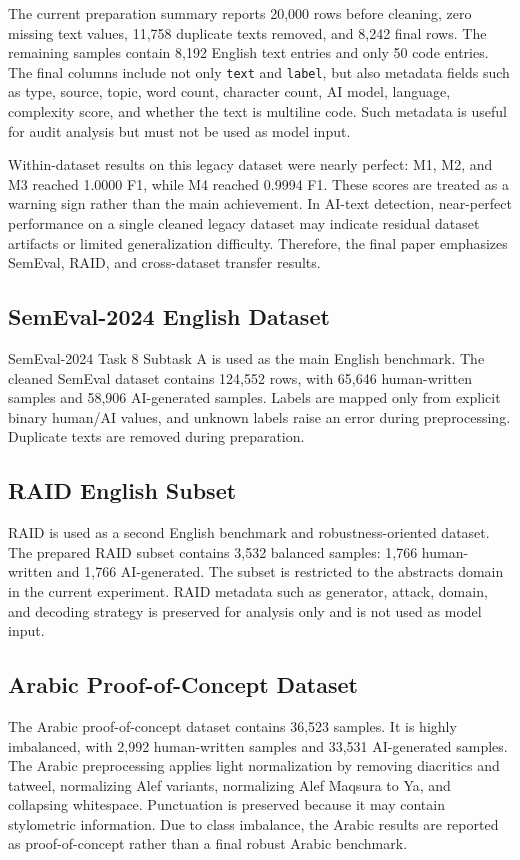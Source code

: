 \documentclass[conference]{IEEEtran}
\begin{document}
The current preparation summary reports 20,000 rows before cleaning, zero missing text values, 11,758 duplicate texts removed, and 8,242 final rows. The remaining samples contain 8,192 English text entries and only 50 code entries. The final columns include not only \texttt{text} and \texttt{label}, but also metadata fields such as type, source, topic, word count, character count, AI model, language, complexity score, and whether the text is multiline code. Such metadata is useful for audit analysis but must not be used as model input.

Within-dataset results on this legacy dataset were nearly perfect: M1, M2, and M3 reached 1.0000 F1, while M4 reached 0.9994 F1. These scores are treated as a warning sign rather than the main achievement. In AI-text detection, near-perfect performance on a single cleaned legacy dataset may indicate residual dataset artifacts or limited generalization difficulty. Therefore, the final paper emphasizes SemEval, RAID, and cross-dataset transfer results.

\subsection{SemEval-2024 English Dataset}
SemEval-2024 Task 8 Subtask A is used as the main English benchmark. The cleaned SemEval dataset contains 124,552 rows, with 65,646 human-written samples and 58,906 AI-generated samples. Labels are mapped only from explicit binary human/AI values, and unknown labels raise an error during preprocessing. Duplicate texts are removed during preparation.

\subsection{RAID English Subset}
RAID is used as a second English benchmark and robustness-oriented dataset. The prepared RAID subset contains 3,532 balanced samples: 1,766 human-written and 1,766 AI-generated. The subset is restricted to the abstracts domain in the current experiment. RAID metadata such as generator, attack, domain, and decoding strategy is preserved for analysis only and is not used as model input.

\subsection{Arabic Proof-of-Concept Dataset}
The Arabic proof-of-concept dataset contains 36,523 samples. It is highly imbalanced, with 2,992 human-written samples and 33,531 AI-generated samples. The Arabic preprocessing applies light normalization by removing diacritics and tatweel, normalizing Alef variants, normalizing Alef Maqsura to Ya, and collapsing whitespace. Punctuation is preserved because it may contain stylometric information. Due to class imbalance, the Arabic results are reported as proof-of-concept rather than a final robust Arabic benchmark.
\end{document}
